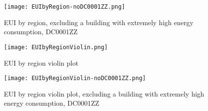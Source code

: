 \documentclass[12pt]{article}
\begin{document}
\begin{figure}[h!]
  \centering
  \texttt{[image: EUIbyRegion-noDC0001ZZ.png]}
  \caption{EUI by region, excluding a building with extremely high energy consumption, DC0001ZZ}
  \label{fig:EuibyRegion-noDC0001ZZ}
\end{figure}

\begin{figure}[h!]
  \centering
  \texttt{[image: EUIbyRegionViolin.png]}
  \caption{EUI by region violin plot}
  \label{fig:EuibyRegionViolin}
\end{figure}

\begin{figure}[h!]
  \centering
  \texttt{[image: EUIbyRegionViolin-noDC0001ZZ.png]}
  \caption{EUI by region violin plot, excluding a building with extremely high energy consumption, DC0001ZZ}
  \label{fig:EuibyRegionViolin-noDC0001ZZ}
\end{figure}

\newpage
 
\end{document}
